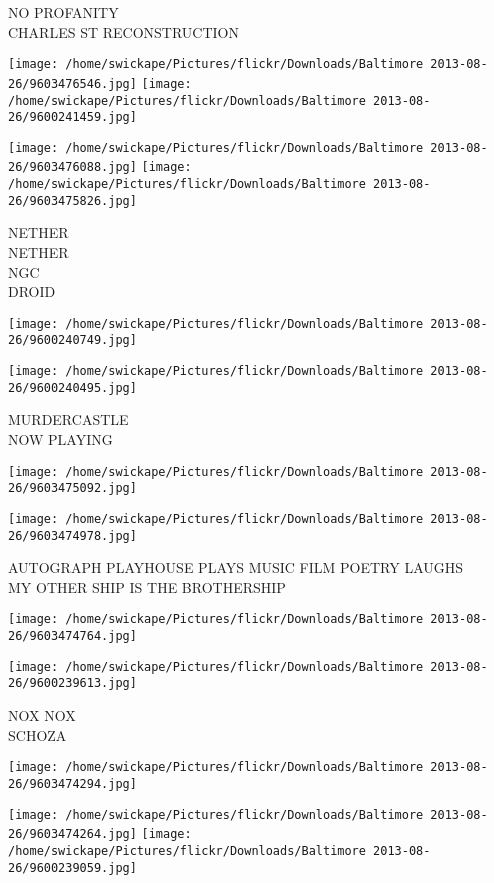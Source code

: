 \documentclass[10pt,letterpaper]{article}
\begin{document}
NO PROFANITY\\
CHARLES ST RECONSTRUCTION
\pagebreak

\texttt{[image: /home/swickape/Pictures/flickr/Downloads/Baltimore 2013-08-26/9603476546.jpg]}
\texttt{[image: /home/swickape/Pictures/flickr/Downloads/Baltimore 2013-08-26/9600241459.jpg]}

\texttt{[image: /home/swickape/Pictures/flickr/Downloads/Baltimore 2013-08-26/9603476088.jpg]}
\texttt{[image: /home/swickape/Pictures/flickr/Downloads/Baltimore 2013-08-26/9603475826.jpg]}

NETHER\\
NETHER\\
NGC\\
DROID
\pagebreak

\texttt{[image: /home/swickape/Pictures/flickr/Downloads/Baltimore 2013-08-26/9600240749.jpg]}

\vspace{0.25in}
\texttt{[image: /home/swickape/Pictures/flickr/Downloads/Baltimore 2013-08-26/9600240495.jpg]}

MURDERCASTLE\\
NOW PLAYING
\pagebreak

\texttt{[image: /home/swickape/Pictures/flickr/Downloads/Baltimore 2013-08-26/9603475092.jpg]}

\vspace{0.25in}
\texttt{[image: /home/swickape/Pictures/flickr/Downloads/Baltimore 2013-08-26/9603474978.jpg]}

AUTOGRAPH PLAYHOUSE PLAYS MUSIC FILM POETRY LAUGHS\\
MY OTHER SHIP IS THE BROTHERSHIP
\pagebreak

\texttt{[image: /home/swickape/Pictures/flickr/Downloads/Baltimore 2013-08-26/9603474764.jpg]}

\vspace{0.25in}
\texttt{[image: /home/swickape/Pictures/flickr/Downloads/Baltimore 2013-08-26/9600239613.jpg]}

NOX NOX\\
SCHOZA
\pagebreak

\texttt{[image: /home/swickape/Pictures/flickr/Downloads/Baltimore 2013-08-26/9603474294.jpg]}

\vspace{0.25in}
\texttt{[image: /home/swickape/Pictures/flickr/Downloads/Baltimore 2013-08-26/9603474264.jpg]}
\texttt{[image: /home/swickape/Pictures/flickr/Downloads/Baltimore 2013-08-26/9600239059.jpg]}
\end{document}
